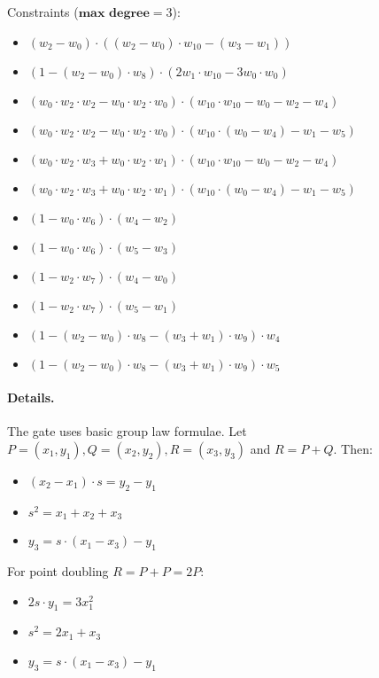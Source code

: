 Constraints ($\textbf{max degree} = 3$):
\begin{itemize}
    \item $(w_2 - w_0)\cdot((w_2 - w_0) \cdot w_{10}- (w_3 - w_1))$
    \item $(1 - (w_2- w_0)\cdot w_8)\cdot (2w_1\cdot w_{10} - 3w_0 \cdot w_0)$
    \item $(w_0 \cdot w_2\cdot w_2 - w_0 \cdot w_2\cdot w_0) \cdot (w_{10} \cdot w_{10} - w_0 - w_2 - w_4)$
    \item $(w_0 \cdot w_2 \cdot w_2 - w_0 \cdot w_2 \cdot w_0) \cdot (w_{10}\cdot (w_0- w_4) - w_1 - w_5)$
    \item $(w_0 \cdot w_2\cdot w_3 + w_0 \cdot w_2\cdot w_1) \cdot (w_{10} \cdot w_{10} - w_0 - w_2  - w_4)$
    \item $ (w_0 \cdot w_2\cdot w_3 + w_0 \cdot w_2\cdot w_1) \cdot(w_{10} \cdot (w_0 - w_4) - w_1 - w_5)$
    \item $(1 - w_0\cdot w_6)\cdot(w_4 -w_2)$
    \item $(1 - w_0 \cdot w_6)\cdot(w_5 - w_3)$
    \item $(1 - w_2 \cdot w_7)\cdot(w_4 - w_0)$
    \item$ (1 - w_2 \cdot w_7)\cdot(w_5 - w_1)$
    \item $(1 - (w_2 - w_0)\cdot w_8 - (w_3 + w_1)\cdot w_9) \cdot w_4$
    \item $(1 - (w_2 - w_0)\cdot w_8 - (w_3 + w_1) \cdot w_9) \cdot w_5$
\end{itemize}

\paragraph{Details.}

The gate uses basic group law formulae.
Let $P = (x_1, y_1), Q = (x_2, y_2), R = (x_3, y_3)$ and $R = P + Q$. Then:
\begin{itemize}
    \item $(x_2 - x_1) \cdot s = y_2 - y_1$
    \item $s^2 = x_1 + x_2 + x_3$
    \item $y_3 = s \cdot (x_1 - x_3) - y_1$
\end{itemize}
For point doubling $R = P + P = 2P$:
\begin{itemize}
    \item $2s \cdot y_1 = 3x_1^2$
    \item $s^2 = 2x_1 + x_3$
    \item $y_3 = s \cdot (x_1 - x_3) - y_1$
\end{itemize}


